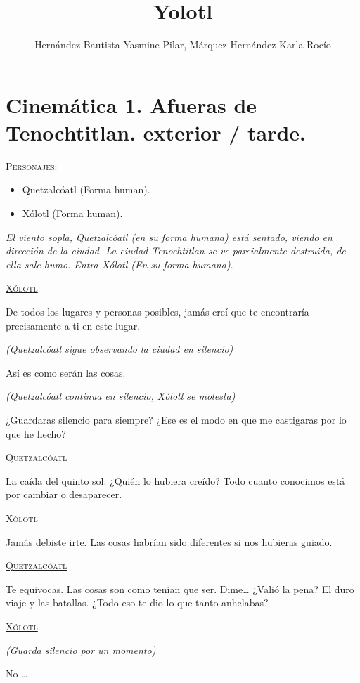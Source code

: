 \documentclass[11pt,letterpaper]{article}
\begin{document}
	\author{Hernández Bautista Yasmine Pilar, Márquez 		Hernández Karla Rocío}
	\title{Yolotl}
	\maketitle
	\tableofcontents
	\section{Cinemática 1. Afueras de Tenochtitlan. exterior / tarde.}
	
\textsc{Personajes}:
\begin{itemize}
	\item Quetzalcóatl (Forma human).
	\item Xólotl (Forma human).
\end{itemize}
\textit{El viento sopla, Quetzalcóatl (en su forma humana) está sentado, viendo en dirección de la ciudad. La ciudad Tenochtitlan se ve parcialmente destruida, de ella sale humo. Entra Xólotl (En su forma humana)}.
\begin{center}
\textsc{\underline{Xólotl}}
\par
De todos los lugares y personas posibles, jamás creí que te encontraría precisamente a ti en este lugar.
\par
\textit{(Quetzalcóatl sigue observando la ciudad en silencio)}
\par
Así es como serán las cosas.
\par 
\textit{(Quetzalcóatl continua en silencio, Xólotl se molesta)}
\par
¿Guardaras silencio para siempre? ¿Ese es el modo en que me castigaras por lo que he hecho?
\\
\par
\textsc{\underline{Quetzalcóatl}}
\par
La caída del quinto sol. ¿Quién lo hubiera creído? Todo cuanto conocimos está por cambiar o desaparecer.
\par
\par
\textsc{\underline{Xólotl}}
\\
\par
Jamás debiste irte. Las cosas habrían sido diferentes si nos hubieras guiado.
\\
\par
\textsc{\underline{Quetzalcóatl}}
\par
Te equivocas. Las cosas son como tenían que ser. Dime… ¿Valió la pena? El duro viaje y las batallas. ¿Todo eso te dio lo que tanto anhelabas?
\\
\par
\textsc{\underline{Xólotl}}
\\
\par
\textit{(Guarda silencio por un momento)}
\\
\par
No …
\end{center}
\end{document}
